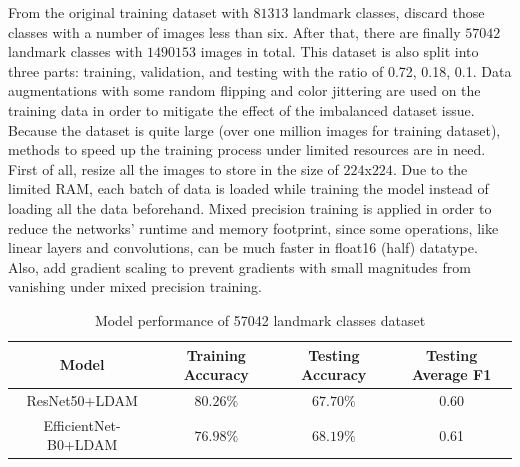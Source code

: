\documentclass[10pt,twocolumn,letterpaper]{article}
\begin{document}
From the original training dataset with $81313$ landmark classes, discard those classes with a number of images less than six. After that, there are finally $57042$ landmark classes with $1490153$ images in total. This dataset is also split into three parts: training, validation, and testing with the ratio of 0.72, 0.18, 0.1. Data augmentations with some random flipping and color jittering are used on the training data in order to mitigate the effect of the imbalanced dataset issue. Because the dataset is quite large (over one million images for training dataset), methods to speed up the training process under limited resources are in need. First of all, resize all the images to store in the size of $224$x$224$. Due to the limited RAM, each batch of data is loaded while training the model instead of loading all the data beforehand. Mixed precision training is applied in order to reduce the networks' runtime and memory footprint, since some operations, like linear layers and convolutions, can be much faster in float16 (half) datatype. Also, add gradient scaling to prevent gradients with small magnitudes from vanishing under mixed precision training.

\begin{table}[]
    \centering
    \begin{tabular}{c c c c}
        \hline Model & Training Accuracy & Testing Accuracy & Testing Average F1 \\ \hline
        ResNet50+LDAM & $80.26\%$ & $67.70\%$ & 0.60 \\
        EfficientNet-B0+LDAM & $76.98\%$ & $68.19\%$ & 0.61 \\ \hline
    \end{tabular}
    \vspace{5pt}
    \caption{Model performance of 57042 landmark classes dataset}
    \label{tab:table3}
\end{table}
\end{document}
